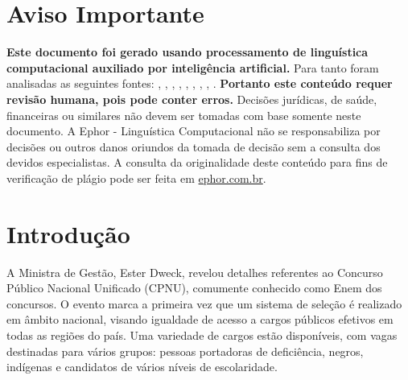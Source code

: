 \documentclass[
   article,       
   12pt,          
   oneside,       
   a4paper,       
   english,       
   brazil,        
   sumario=tradicional
   ]{abntex2}
\begin{document}
\frenchspacing 
\maketitle

\textual
\section{Aviso Importante}
\textbf{Este documento foi gerado usando processamento de linguística computacional auxiliado por inteligência artificial.} Para tanto foram analisadas as seguintes fontes:  \cite{Concurso_Nacional_Unificado_edital_e_retifica}, \cite{Concurso_unificado_a_novidade_do_momentoextbu}, \cite{Concurso_Unificado_Divulgadas_novas_retificac}, \cite{Enem_dos_Concursos_cerca_de_2_mil_vagas_serao}, \cite{Enem_dos_Concursos_quando_comeca_quanto_custa}, \cite{Enem_dos_concursos_tem_vagas_para_o_Tocantins}, \cite{Inscricoes_para_Enem_dos_Concursos_comecam_ne}, \cite{ldquoEnem_dos_Concursosrdquo_recebe_mais_de_7}, \cite{Saiba_como_vai_funcionar_o_Enem_dos_concursos}.
\textbf{Portanto este conteúdo requer revisão humana, pois pode conter erros.} Decisões jurídicas, de saúde, financeiras ou similares não devem ser tomadas com base somente neste documento. A Ephor - Linguística Computacional não se responsabiliza por decisões ou outros danos oriundos da tomada de decisão sem a consulta dos devidos especialistas.
A consulta da originalidade deste conteúdo para fins de verificação de plágio pode ser feita em \href{http://www.ephor.com.br}{ephor.com.br}.
\section {Introdução}A Ministra de Gestão, Ester Dweck, revelou detalhes referentes ao Concurso Público Nacional Unificado (CPNU), comumente conhecido como \textquotedbl{}Enem dos concursos\textquotedbl{}. O evento marca a primeira vez que um sistema de seleção é realizado em âmbito nacional, visando igualdade de acesso a cargos públicos efetivos em todas as regiões do país. Uma variedade de cargos estão disponíveis, com vagas destinadas para vários grupos: pessoas portadoras de deficiência, negros, indígenas e candidatos de vários níveis de escolaridade.
\end{document}
